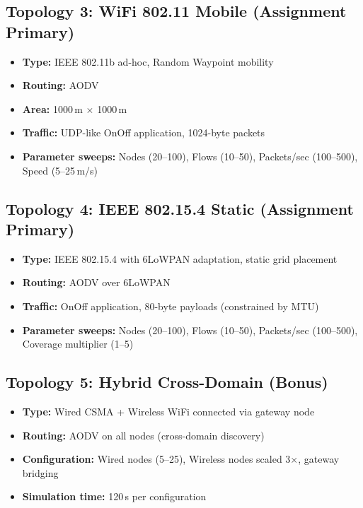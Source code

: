 \documentclass[12pt,a4paper]{article}
\begin{document}
\subsection{Topology 3: WiFi 802.11 Mobile (Assignment Primary)}
\label{sec:topo_wifi}
\begin{itemize}[nosep]
    \item \textbf{Type:} IEEE 802.11b ad-hoc, Random Waypoint mobility
    \item \textbf{Routing:} AODV
    \item \textbf{Area:} 1000\,m $\times$ 1000\,m
    \item \textbf{Traffic:} UDP-like OnOff application, 1024-byte packets
    \item \textbf{Parameter sweeps:} Nodes (20--100), Flows (10--50), Packets/sec (100--500),
    Speed (5--25\,m/s)
\end{itemize}

\subsection{Topology 4: IEEE 802.15.4 Static (Assignment Primary)}
\label{sec:topo_wpan}
\begin{itemize}[nosep]
    \item \textbf{Type:} IEEE 802.15.4 with 6LoWPAN adaptation, static grid placement
    \item \textbf{Routing:} AODV over 6LoWPAN
    \item \textbf{Traffic:} OnOff application, 80-byte payloads (constrained by MTU)
    \item \textbf{Parameter sweeps:} Nodes (20--100), Flows (10--50), Packets/sec (100--500), Coverage multiplier (1--5)
\end{itemize}

\subsection{Topology 5: Hybrid Cross-Domain (Bonus)}
\label{sec:topo_cross}
\begin{itemize}[nosep]
    \item \textbf{Type:} Wired CSMA + Wireless WiFi connected via gateway node
    \item \textbf{Routing:} AODV on all nodes (cross-domain discovery)
    \item \textbf{Configuration:} Wired nodes (5--25), Wireless nodes scaled 3$\times$, gateway bridging
    \item \textbf{Simulation time:} 120\,s per configuration
\end{itemize}
\end{document}
